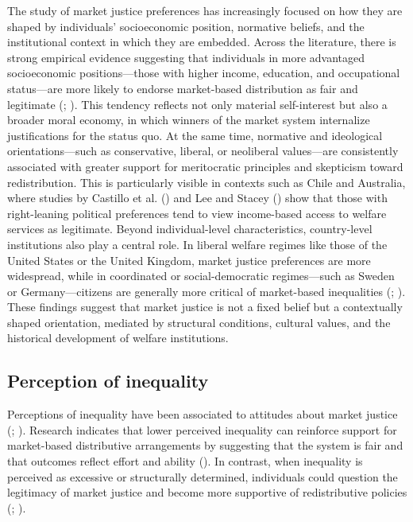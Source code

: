 \documentclass[
  12pt,
]{article}
\begin{document}
The study of market justice preferences has increasingly focused on how
they are shaped by individuals' socioeconomic position, normative
beliefs, and the institutional context in which they are embedded.
Across the literature, there is strong empirical evidence suggesting
that individuals in more advantaged socioeconomic positions---those with
higher income, education, and occupational status---are more likely to
endorse market-based distribution as fair and legitimate
(;
). This tendency
reflects not only material self-interest but also a broader moral
economy, in which winners of the market system internalize
justifications for the status quo. At the same time, normative and
ideological orientations---such as conservative, liberal, or neoliberal
values---are consistently associated with greater support for
meritocratic principles and skepticism toward redistribution. This is
particularly visible in contexts such as Chile and Australia, where
studies by Castillo et al.
() and Lee and Stacey
() show that those with
right-leaning political preferences tend to view income-based access to
welfare services as legitimate. Beyond individual-level characteristics,
country-level institutions also play a central role. In liberal welfare
regimes like those of the United States or the United Kingdom, market
justice preferences are more widespread, while in coordinated or
social-democratic regimes---such as Sweden or Germany---citizens are
generally more critical of market-based inequalities
(;
). These findings suggest
that market justice is not a fixed belief but a contextually shaped
orientation, mediated by structural conditions, cultural values, and the
historical development of welfare institutions.

\subsection{Perception of inequality}\label{perception-of-inequality}

Perceptions of inequality have been associated to attitudes about market
justice (;
). Research indicates that
lower perceived inequality can reinforce support for market-based
distributive arrangements by suggesting that the system is fair and that
outcomes reflect effort and ability (). In contrast, when inequality is perceived as excessive or
structurally determined, individuals could question the legitimacy of
market justice and become more supportive of redistributive policies
(;
).
\end{document}
